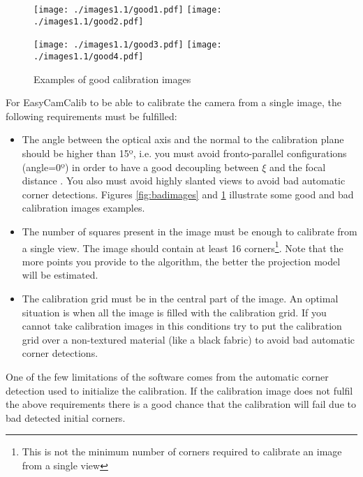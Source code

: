 \documentclass[article,11pt]{memoir}
\begin{document}
\begin{figure}[t]
\centering
  \begin{minipage}[2\textwidth]{1\textwidth}
  \centering
  \texttt{[image: ./images1.1/good1.pdf]}
  \texttt{[image: ./images1.1/good2.pdf]}
  \end{minipage}
  \vfill
  \begin{minipage}[2\textwidth]{1\textwidth}
  \centering
  \texttt{[image: ./images1.1/good3.pdf]}
  \texttt{[image: ./images1.1/good4.pdf]}
  \end{minipage}
\caption{Examples of good calibration images}
\label{fig:goodimages}
\end{figure}


For EasyCamCalib to be able to calibrate the camera from a single image, the following requirements must be fulfilled:



\begin{itemize}
 \item The angle between the optical axis and the normal to the calibration plane should be higher than 15º, i.e. you must avoid fronto-parallel configurations (angle=0º) in order to have a good decoupling between $\xi$ and the focal distance \cite{barreto_09}. You also must avoid highly slanted views to avoid bad automatic corner detections. Figures \ref{fig:badimages} and \ref{fig:goodimages} illustrate some good and bad calibration images examples. 
 \item The number of squares present in the image must be enough to calibrate from a single view. The image should contain at least 16 corners\footnote{This is not the minimum number of corners required to calibrate an image from a single view}. Note that the more points you provide to the algorithm, the better the projection model will be estimated.
 \item The calibration grid must be in the central part of the image. An optimal situation is when all the image is filled with the calibration grid. If you cannot take calibration images in this conditions try to put the calibration grid over a non-textured material (like a black fabric) to avoid bad automatic corner detections.
\end{itemize}

One of the few limitations of the software comes from the automatic corner detection used to initialize the calibration. If the calibration image does not fulfil the above requirements there is a good chance that the calibration will fail due to bad detected initial corners.
\end{document}

